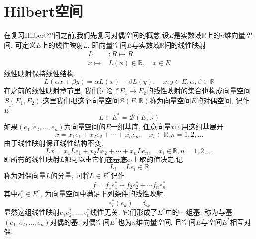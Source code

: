 \documentclass{book}
\begin{document}
\section{Hilbert空间}
在复习Hilbert空间之前,我们先复习对偶空间的概念.设$E$是实数域$\mathbb{R}$上的$n$维向量空间, 可定义$E$上的线性映射$L$. 即向量空间$E$与实数域$\mathbb{R}$间的线性映射
\begin{equation*}
\begin{split}
   L&:R\mapsto R \\
     x\mapsto&L(x)\in \mathbb{R},\quad x\in E
\end{split}
\end{equation*}
线性映射保持线性结构.
\begin{equation*}
  L(\alpha x+\beta y)=\alpha L(x)+\beta L(y),\quad x,y\in E,\alpha,\beta\in\mathbb{R}
\end{equation*}
在之前的线性映射章节里, 我们讨论了$E_1\mapsto E_2$的线性映射的集合也构成向量空间$\mathcal{B}(E_1,E_2)$.这里我们把这个向量空间$\mathcal{B}(E,\mathbb{R})$称为向量空间$E$的对偶空间, 记作$E^*$
\begin{equation*}
  L\in E^*=\mathcal{B}(E,\mathbb{R})
\end{equation*}
如果$(e_1,e_2,\dots,e_n)$为向量空间的$E$一组基底, 任意向量$x$可用这组基展开
\begin{equation*}
  x=x_1e_1+x_2e_2+\cdots+x_ne_n, \quad x_i\in\mathbb{R},n=1,2,\dots
\end{equation*}
由于线性映射保证线性结构不变.
\begin{equation*}
  Lx=x_1Le_1+x_2Le_2+\cdots+x_nLe_n, \quad x_i\in\mathbb{R},n=1,2,\dots
\end{equation*}
即所有的线性映射$L$都可以由它们在基底$e_i$上取的值决定.记
\begin{equation*}
  L_i=Le_i\in\mathbb{R}
\end{equation*}
称为对偶向量$L$的分量, 可将$L\in E^*$记作
\begin{equation*}
  f=f_1e_1^*+f_2e_2^*+\cdots f_ne_n^*
\end{equation*}
其中$e_i^*\in E^*$, 为向量空间中满足下列条件的线性映射.
\begin{equation*}
  e_i^*(e_k)=\delta_{ik}
\end{equation*}
显然这组线性映射$e_1^,e_2^*,\dots,e_n^*$线性无关. 它们形成了$E^*$中的一组基, 称为与基$(e_1,e_2,\dots,e_n)$对偶的基. 对偶空间$E^*$也为$n$维向量空间, 且空间$E$与空间$E^*$相互对偶.
\end{document}
